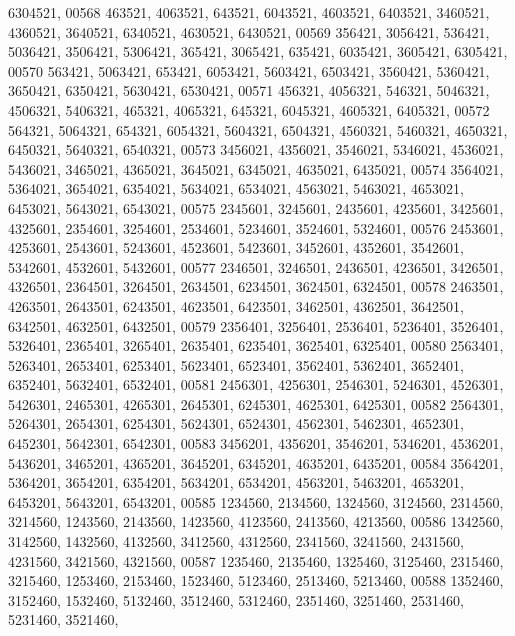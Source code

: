 \begin{DoxyCode}
      6304521,
00568        463521, 4063521,  643521, 6043521, 4603521, 6403521, 3460521, 4360521, 3640521, 6340521, 4630521, 
      6430521,
00569        356421, 3056421,  536421, 5036421, 3506421, 5306421,  365421, 3065421,  635421, 6035421, 3605421, 
      6305421,
00570        563421, 5063421,  653421, 6053421, 5603421, 6503421, 3560421, 5360421, 3650421, 6350421, 5630421, 
      6530421,
00571        456321, 4056321,  546321, 5046321, 4506321, 5406321,  465321, 4065321,  645321, 6045321, 4605321, 
      6405321,
00572        564321, 5064321,  654321, 6054321, 5604321, 6504321, 4560321, 5460321, 4650321, 6450321, 5640321, 
      6540321,
00573       3456021, 4356021, 3546021, 5346021, 4536021, 5436021, 3465021, 4365021, 3645021, 6345021, 4635021, 
      6435021,
00574       3564021, 5364021, 3654021, 6354021, 5634021, 6534021, 4563021, 5463021, 4653021, 6453021, 5643021, 
      6543021,
00575       2345601, 3245601, 2435601, 4235601, 3425601, 4325601, 2354601, 3254601, 2534601, 5234601, 3524601, 
      5324601,
00576       2453601, 4253601, 2543601, 5243601, 4523601, 5423601, 3452601, 4352601, 3542601, 5342601, 4532601, 
      5432601,
00577       2346501, 3246501, 2436501, 4236501, 3426501, 4326501, 2364501, 3264501, 2634501, 6234501, 3624501, 
      6324501,
00578       2463501, 4263501, 2643501, 6243501, 4623501, 6423501, 3462501, 4362501, 3642501, 6342501, 4632501, 
      6432501,
00579       2356401, 3256401, 2536401, 5236401, 3526401, 5326401, 2365401, 3265401, 2635401, 6235401, 3625401, 
      6325401,
00580       2563401, 5263401, 2653401, 6253401, 5623401, 6523401, 3562401, 5362401, 3652401, 6352401, 5632401, 
      6532401,
00581       2456301, 4256301, 2546301, 5246301, 4526301, 5426301, 2465301, 4265301, 2645301, 6245301, 4625301, 
      6425301,
00582       2564301, 5264301, 2654301, 6254301, 5624301, 6524301, 4562301, 5462301, 4652301, 6452301, 5642301, 
      6542301,
00583       3456201, 4356201, 3546201, 5346201, 4536201, 5436201, 3465201, 4365201, 3645201, 6345201, 4635201, 
      6435201,
00584       3564201, 5364201, 3654201, 6354201, 5634201, 6534201, 4563201, 5463201, 4653201, 6453201, 5643201, 
      6543201,
00585       1234560, 2134560, 1324560, 3124560, 2314560, 3214560, 1243560, 2143560, 1423560, 4123560, 2413560, 
      4213560,
00586       1342560, 3142560, 1432560, 4132560, 3412560, 4312560, 2341560, 3241560, 2431560, 4231560, 3421560, 
      4321560,
00587       1235460, 2135460, 1325460, 3125460, 2315460, 3215460, 1253460, 2153460, 1523460, 5123460, 2513460, 
      5213460,
00588       1352460, 3152460, 1532460, 5132460, 3512460, 5312460, 2351460, 3251460, 2531460, 5231460, 3521460, 

\end{DoxyCode}
